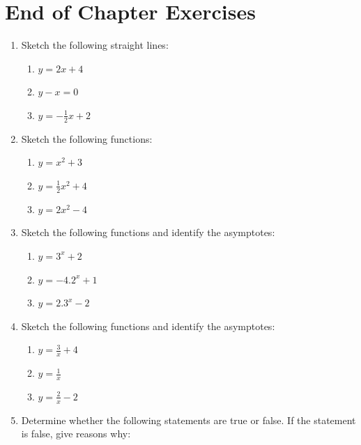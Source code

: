             \section{ End of Chapter Exercises}
            \nopagebreak
      \label{m39348*id253432}\begin{enumerate}[noitemsep, label=\textbf{\arabic*}. ] 
            \label{m39348*uid405}\item Sketch the following straight lines: 
\label{m39348*id254512}\begin{enumerate}[noitemsep, label=\textbf{\alph*}. ] 
            \item 
$y=2x+4$ \item 
$y-x=0$ \item  
$y=-\frac{1}{2}x+2$\end{enumerate}
        \label{m39348*uid406}\item Sketch the following functions: 
\label{m39348*id254513}\begin{enumerate}[noitemsep, label=\textbf{\alph*}. ] 
            \item 
$y={x}^{2}+3$ \item 
$y=\frac{1}{2}{x}^{2}+4$\item 
$y=2{x}^{2}-4$\end{enumerate}
        \label{m39348*uid407}\item Sketch the following functions and identify the asymptotes: 
\label{m39348*id254514}\begin{enumerate}[noitemsep, label=\textbf{\alph*}. ] 
            \item 
$y={3}^{x}+2$ \item 
$y=-4.{2}^{x}+1$ \item 
$y=2.{3}^{x}-2$ \end{enumerate}
        \label{m39348*uid408}\item Sketch the following functions and identify the asymptotes: 
\label{m39348*id254515}\begin{enumerate}[noitemsep, label=\textbf{\alph*}. ] 
            \item 
$y=\frac{3}{x}+4$ \item 
$y=\frac{1}{x}$ \item 
$y=\frac{2}{x}-2$ \end{enumerate}
        \label{m39348*uid409}\item Determine whether the following statements are true or false. If the statement is false, give reasons why:
\label{m39348*id254516}\begin{enumerate}[noitemsep, label=\textbf{\alph*}. ] 

\end{enumerate}
\end{enumerate}
